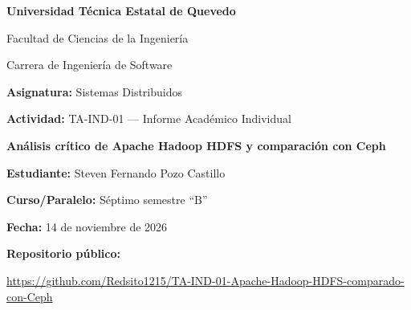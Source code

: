 \documentclass[12pt,a4paper]{article}
\begin{document}

\begin{titlepage}
  \centering
  \vspace*{1.5cm}
  {\Large\textbf{Universidad Técnica Estatal de Quevedo}\par}
  \vspace{0.5cm}
  {\large Facultad de Ciencias de la Ingeniería\par}
  {\large Carrera de Ingeniería de Software\par}

  \vspace{1.8cm}
  {\large\textbf{Asignatura:} Sistemas Distribuidos\par}
  \vspace{0.3cm}
  {\large\textbf{Actividad:} TA-IND-01 --- Informe Académico Individual\par}

  \vspace{1.8cm}
  {\LARGE\textbf{Análisis crítico de Apache Hadoop HDFS y comparación con Ceph}\par}

  \vspace{1.8cm}
  {\large\textbf{Estudiante:} Steven Fernando Pozo Castillo\par}
  {\large\textbf{Curso/Paralelo:} Séptimo semestre ``B''\par}
  {\large\textbf{Fecha:} 14 de noviembre de 2026\par}

  \vfill
  {\large\textbf{Repositorio público:}\par}
  \vspace{0.2cm}
  {\small\url{https://github.com/Redsito1215/TA-IND-01-Apache-Hadoop-HDFS-comparado-con-Ceph}\par}
\end{titlepage}

\clearpage
{}

\begin{abstract}
Este informe analiza Apache Hadoop Distributed File System (HDFS), un sistema de archivos distribuido utilizado para almacenar grandes volúmenes de información en varios equipos. El estudio se concentra en la función del NameNode, la distribución de bloques entre DataNodes y la replicación como mecanismo de tolerancia a fallos. Los conceptos de transparencia, comunicación, CAP y PACELC se aplican a la arquitectura real, evitando tratar a HDFS como si fuera una base de datos transaccional. Además, se realiza una prueba local con Docker formada por un NameNode y tres DataNodes. En ella se almacena un archivo con factor de replicación tres, se pausa uno de los nodos y se comprueba que la lectura continúa desde otra copia. Los resultados se contrastan con Ceph, que distribuye la ubicación de objetos mediante CRUSH y evita depender de un único servicio equivalente al NameNode para resolver cada acceso. Se concluye que HDFS ofrece una solución sencilla y resistente para archivos grandes y procesamiento por lotes, aunque la centralización de metadatos y el costo de mantener varias copias limitan su conveniencia en cargas con muchos archivos pequeños o acceso de baja latencia.
\end{abstract}
\end{document}
